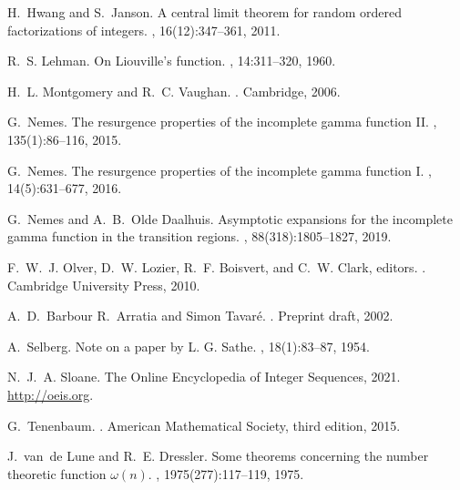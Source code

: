 \documentclass[11pt,reqno,a4letter]{article}
\numberwithin{equation}{section}
\numberwithin{figure}{section}
\numberwithin{table}{section}
\theoremstyle{plain}
\numberwithin{theorem}{section}
\theoremstyle{definition}
\begin{document}
\begin{thebibliography}{10}
H.~Hwang and S.~Janson.
\newblock A central limit theorem for random ordered factorizations of
  integers.
, 16(12):347--361, 2011.

R.~S. Lehman.
\newblock On {L}iouville's function.
, 14:311--320, 1960.

H.~L. Montgomery and R.~C. Vaughan.
.
\newblock Cambridge, 2006.

G.~Nemes.
\newblock The resurgence properties of the incomplete gamma function {II}.
, 135(1):86--116, 2015.

G.~Nemes.
\newblock The resurgence properties of the incomplete gamma function {I}.
, 14(5):631--677, 2016.

G.~Nemes and A.~B.~Olde Daalhuis.
\newblock Asymptotic expansions for the incomplete gamma function in the
  transition regions.
, 88(318):1805--1827, 2019.

F.~W.~J. Olver, D.~W. Lozier, R.~F. Boisvert, and C.~W. Clark, editors.
.
\newblock Cambridge University Press, 2010.

A.~D.~Barbour R.~Arratia and Simon Tavar{\'{e}}.
.
\newblock Preprint draft, 2002.

A.~Selberg.
\newblock Note on a paper by {L}. {G}. {S}athe.
, 18(1):83--87, 1954.

N.~J.~A. Sloane.
\newblock The {O}nline {E}ncyclopedia of {I}nteger {S}equences, 2021.
\newblock \url{http://oeis.org}.

G.~Tenenbaum.
.
\newblock American Mathematical Society, third edition, 2015.

J.~van~de Lune and R.~E. Dressler.
\newblock Some theorems concerning the number theoretic function $\omega(n)$.
, 1975(277):117--119, 1975.

\end{thebibliography}
\end{document}
